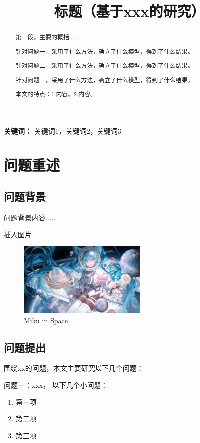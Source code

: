\documentclass[12pt,a4paper]{article}
\title{\zihao{3}\heiti 标题（基于xxx的研究）}
\author{}
\date{}
\numberwithin{figure}{subsection}
\numberwithin{figure}{subsection}
\begin{document}
\maketitle
\thispagestyle{empty}
\vspace{-2.5cm}
\begin{abstract}
\vspace{-0.5cm}
\songti
第一段，主要的概括...... 

针对问题一，采用了什么方法，确立了什么模型，得到了什么结果。

针对问题二，采用了什么方法，确立了什么模型，得到了什么结果。

针对问题三，采用了什么方法，确立了什么模型，得到了什么结果。

本文的特点：1.内容。2.内容。
\end{abstract}

\vspace{0cm}
\noindent%
\textbf{关键词：} 关键词1，关键词2，关键词3
\newpage

\tableofcontents
\thispagestyle{empty}
\newpage
\setcounter{page}{1}
\section{问题重述}
\subsection{问题背景}
问题背景内容.....

插入图片
\begin{figure}[ht]%
  \centering
  \includegraphics[width = 0.55\textwidth]{figures/Miku_Space.jpg}
  \caption{Miku in Space}
  \label{img:Miku}    
\end{figure}
\subsection{问题提出}
围绕xx的问题，本文主要研究以下几个问题：

问题一：xxx， 以下几个小问题：
\begin{enumerate}[itemsep=-0.2em,topsep=0em]
  \item 第一项
  \item 第二项
  \item 第三项
\end{enumerate}
\end{document}
